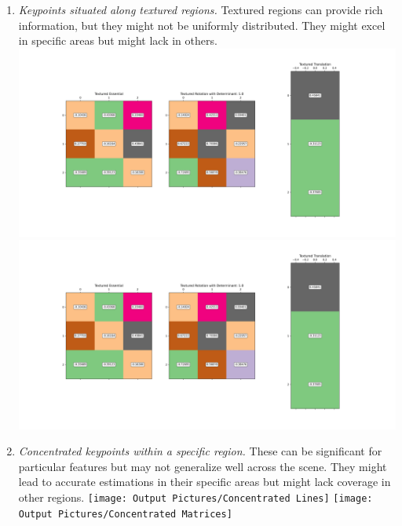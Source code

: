 \documentclass[11pt]{article}
\begin{document}
\begin{itemize}
\begin{enumerate}
            \item \textit{Keypoints situated along textured regions.}\newline
            Textured regions can provide rich information, but they might not be uniformly distributed.
            They might excel in specific areas but might lack in others.\newline
            \includegraphics[width=\textwidth]{Output Pictures/Textured Lines}\newline
            \includegraphics[width=\textwidth]{Output Pictures/Textured Matrices}\newline

            \item \textit{Concentrated keypoints within a specific region.}\newline
            These can be significant for particular features but may not generalize well across the scene.
            They might lead to accurate estimations in their specific areas but might lack coverage in other regions.\newline
            \texttt{[image: Output Pictures/Concentrated Lines]}\newline
            \texttt{[image: Output Pictures/Concentrated Matrices]}\newline


\end{enumerate}
\end{itemize}
\end{document}
